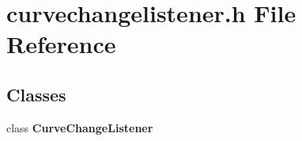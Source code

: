 \section{curvechangelistener.\+h File Reference}
\label{curve_2curvechangelistener_8h}
\subsection*{Classes}
\begin{DoxyCompactItemize}
\item 
class {\bf Curve\+Change\+Listener}
\end{DoxyCompactItemize}
